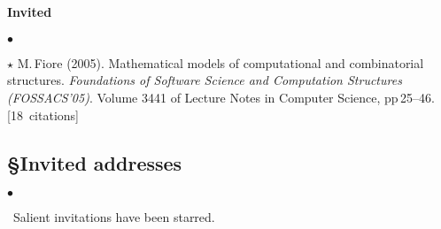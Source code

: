 \documentclass[11pt,twocolumn]{article}
\newenvironment{myitemize}
  {\begin{list}{$\bullet$}
  {\setlength{\topsep}{1pt}
   \setlength{\partopsep}{1pt}
   \setlength{\itemsep}{0pt}
   \setlength{\parsep}{0pt}
   \setlength{\leftmargin}{1em}
   \setlength{\labelwidth}{.5em}}}
  {\end{list}}
\newenvironment{mybigitemize}
  {\begin{list}{$\bullet$}
  {\setlength{\topsep}{2pt}
   \setlength{\partopsep}{2pt}
   \setlength{\itemsep}{2.5pt}
   \setlength{\parsep}{2.5pt}
   \setlength{\leftmargin}{1em}
   \setlength{\labelwidth}{.5em}}}
  {\end{list}}
\begin{document}
\paragraph*{Invited}

\begin{mybigitemize}
\item[$\star$]
  M.\,Fiore (2005).  Mathematical models of computational and combinatorial
  structures.  {\em Foundations of Software Science and Computation Structures
    (FOSSACS'05)}.  Volume 3441 of Lecture Notes in Computer Science,
  pp\,25--46.\mbox{}\hfill{\small[18~citations]}
\end{mybigitemize}

\subsection*{\S\enspace\thinspace Invited addresses}
\vspace*{-1.125mm}
\begin{myitemize}
\item[]\small\ 
  Salient invitations have been starred.
\end{myitemize}
\end{document}
